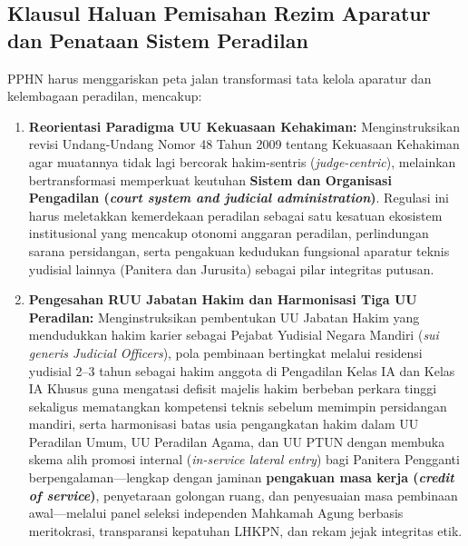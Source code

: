 \documentclass[12pt,a4paper,twocolumn]{article}
\begin{document}
\subsection{Klausul Haluan Pemisahan Rezim Aparatur dan Penataan Sistem Peradilan}
PPHN harus menggariskan peta jalan transformasi tata kelola aparatur dan kelembagaan peradilan, mencakup:
\begin{enumerate}
    \item \textbf{Reorientasi Paradigma UU Kekuasaan Kehakiman:} Menginstruksikan revisi Undang-Undang Nomor 48 Tahun 2009 tentang Kekuasaan Kehakiman agar muatannya tidak lagi bercorak hakim-sentris (\textit{judge-centric}), melainkan bertransformasi memperkuat keutuhan \textbf{Sistem dan Organisasi Pengadilan (\textit{court system and judicial administration})}. Regulasi ini harus meletakkan kemerdekaan peradilan sebagai satu kesatuan ekosistem institusional yang mencakup otonomi anggaran peradilan, perlindungan sarana persidangan, serta pengakuan kedudukan fungsional aparatur teknis yudisial lainnya (Panitera dan Jurusita) sebagai pilar integritas putusan.
    \item \textbf{Pengesahan RUU Jabatan Hakim dan Harmonisasi Tiga UU Peradilan:} Menginstruksikan pembentukan UU Jabatan Hakim yang mendudukkan hakim karier sebagai Pejabat Yudisial Negara Mandiri (\textit{sui generis Judicial Officers}), pola pembinaan bertingkat melalui residensi yudisial 2--3 tahun sebagai hakim anggota di Pengadilan Kelas IA dan Kelas IA Khusus guna mengatasi defisit majelis hakim berbeban perkara tinggi sekaligus mematangkan kompetensi teknis sebelum memimpin persidangan mandiri, serta harmonisasi batas usia pengangkatan hakim dalam UU Peradilan Umum, UU Peradilan Agama, dan UU PTUN dengan membuka skema alih promosi internal (\textit{in-service lateral entry}) bagi Panitera Pengganti berpengalaman—lengkap dengan jaminan \textbf{pengakuan masa kerja (\textit{credit of service})}, penyetaraan golongan ruang, dan penyesuaian masa pembinaan awal—melalui panel seleksi independen Mahkamah Agung berbasis meritokrasi, transparansi kepatuhan LHKPN, dan rekam jejak integritas etik.

\end{enumerate}
\end{document}
